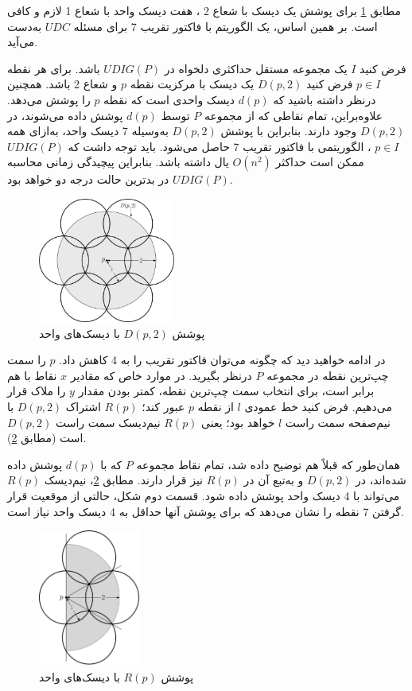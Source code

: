 \documentclass[12pt]{article}
\begin{document}
مطابق \cref{fig:f1} برای پوشش یک دیسک با شعاع 2 ، هفت دیسک واحد با شعاع 1 لازم و کافی است. بر همین اساس، یک الگوریتم با فاکتور تقریب 7 برای مسئله $UDC$ به‌دست می‌آید.

فرض کنید $I$ یک مجموعه مستقل حداکثری دلخواه در $UDIG(P)$ باشد. برای هر نقطه $p \in I$ فرض کنید $D(p,2)$ یک دیسک با مرکزیت نقطه $p$ و شعاع 2 باشد. همچنین درنظر داشته باشید که $d(p)$ دیسک واحدی است که نقطه $p$ را پوشش می‌دهد. علاوه‌براین، تمام نقاطی که از مجموعه $P$ توسط $d(p)$ پوشش داده می‌شوند، در $D(p,2)$ وجود دارند. بنابراین با پوشش $D(p,2)$ به‌وسیله 7 دیسک واحد، به‌ازای همه $p \in I$ ، الگوریتمی با فاکتور تقریب 7 حاصل می‌شود. باید توجه داشت که $UDIG(P)$ ممکن است حداکثر $O(n^{2})$ یال داشته باشد. بنابراین پیچیدگی زمانی محاسبه $UDIG(P)$ در بدترین حالت درجه دو خواهد بود.

\begin{figure}[!h]
\centering
\includegraphics[width=0.4\textwidth]{figs/f1}
\caption{
پوشش $D(p,2)$ با دیسک‌های واحد
}
\label{fig:f1}
\end{figure}

در ادامه خواهید دید که چگونه می‌توان فاکتور تقریب را به 4 کاهش داد. $p$ را سمت چپ‌ترین نقطه در مجموعه $P$ درنظر بگیرید. در موارد خاص که مقادیر $x$ نقاط با هم برابر است، برای انتخاب سمت چپ‌ترین نقطه، کمتر بودن مقدار $y$ را ملاک قرار می‌دهیم. فرض کنید خط عمودی $l$ از نقطه $p$ عبور کند؛ $R(p)$ اشتراک $D(p,2)$ با نیم‌صفحه%
سمت راست $l$ خواهد بود؛ یعنی $R(p)$ نیم‌دیسک سمت راست $D(p,2)$ است (مطابق \cref{fig:f2}).

همان‌طور که قبلاً هم توضیح داده شد، تمام نقاط مجموعه $P$ که با $d(p)$ پوشش داده شده‌اند، در $D(p,2)$ و به‌تبع آن در $R(p)$ نیز قرار دارند. مطابق \cref{fig:f2}، نیم‌دیسک $R(p)$ می‌تواند با 4 دیسک واحد پوشش داده شود. قسمت دوم شکل، حالتی از موقعیت قرار گرفتن 7 نقطه را نشان می‌دهد که برای پوشش آنها حداقل به 4 دیسک واحد نیاز است.

\begin{figure}[!h]
\centering
\includegraphics[width=0.3\textwidth]{figs/f2}
\caption{
پوشش $R(p)$ با دیسک‌های واحد
}
\label{fig:f2}
\end{figure}
\end{document}

